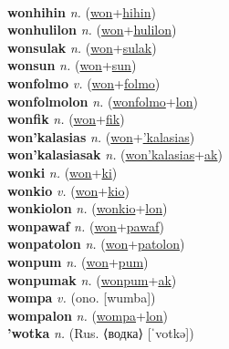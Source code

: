  \label{wonmyawf} \\
\textbf{wonhihin} \textit{n.} (\hyperref[won]{won}+\hyperref[hihin]{hihin})
 \label{wonhihin} \\
\textbf{wonhulilon} \textit{n.} (\hyperref[won]{won}+\hyperref[hulilon]{hulilon})
 \label{wonhulilon} \\
\textbf{wonsulak} \textit{n.} (\hyperref[won]{won}+\hyperref[sulak]{sulak})
 \label{wonsulak} \\
\textbf{wonsun} \textit{n.} (\hyperref[won]{won}+\hyperref[sun]{sun})
 \label{wonsun} \\
\textbf{wonfolmo} \textit{v.} (\hyperref[won]{won}+\hyperref[folmo]{folmo})
 \label{wonfolmo} \\
\textbf{wonfolmolon} \textit{n.} (\hyperref[wonfolmo]{wonfolmo}+\hyperref[lon]{lon})
 \label{wonfolmolon} \\
\textbf{wonfik} \textit{n.} (\hyperref[won]{won}+\hyperref[fik]{fik})
 \label{wonfik} \\
\textbf{won'kalasias} \textit{n.} (\hyperref[won]{won}+\hyperref['kalasias]{'kalasias})
 \label{won'kalasias} \\
\textbf{won'kalasiasak} \textit{n.} (\hyperref[won'kalasias]{won'kalasias}+\hyperref[ak]{ak})
 \label{won'kalasiasak} \\
\textbf{wonki} \textit{n.} (\hyperref[won]{won}+\hyperref[ki]{ki})
 \label{wonki} \\
\textbf{wonkio} \textit{v.} (\hyperref[won]{won}+\hyperref[kio]{kio})
 \label{wonkio} \\
\textbf{wonkiolon} \textit{n.} (\hyperref[wonkio]{wonkio}+\hyperref[lon]{lon})
 \label{wonkiolon} \\
\textbf{wonpawaf} \textit{n.} (\hyperref[won]{won}+\hyperref[pawaf]{pawaf})
 \label{wonpawaf} \\
\textbf{wonpatolon} \textit{n.} (\hyperref[won]{won}+\hyperref[patolon]{patolon})
 \label{wonpatolon} \\
\textbf{wonpum} \textit{n.} (\hyperref[won]{won}+\hyperref[pum]{pum})
 \label{wonpum} \\
\textbf{wonpumak} \textit{n.} (\hyperref[wonpum]{wonpum}+\hyperref[ak]{ak})
 \label{wonpumak} \\
\textbf{wompa} \textit{v.} (ono. [wumba])
 \label{wompa} \\
\textbf{wompalon} \textit{n.} (\hyperref[wompa]{wompa}+\hyperref[lon]{lon})
 \label{wompalon} \\
\textbf{'wotka} \textit{n.} (Rus. ⟨водка⟩ [ˈvotkə])
 \label{'wotka} \\
